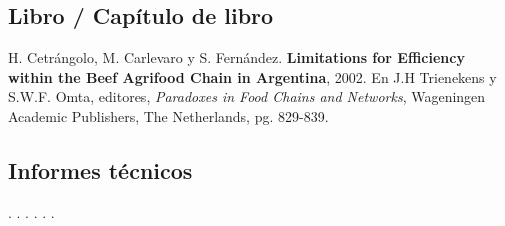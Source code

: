 \subsection{Libro / Capítulo de libro}

\begin{timeline}
 \libropython

 H. Cetrángolo, M. Carlevaro y S. Fernández. \textbf{Limitations for Efficiency within the Beef Agrifood Chain in Argentina}, 2002. En J.H Trienekens y S.W.F. Omta, editores,  \textit{Paradoxes in Food Chains and Networks}, Wageningen Academic Publishers, The Netherlands, pg. 829-839.
\end{timeline}

\subsection{Informes técnicos}
\begin{ntimeline}
   .
   .
   .
   .
   .
   .
\end{ntimeline}


